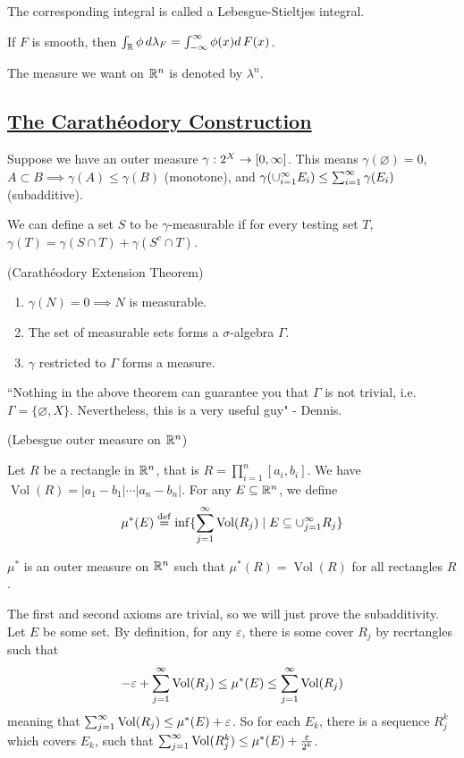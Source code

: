 \documentclass[x11names,reqno,14pt]{extarticle}
\newcommand{\seq}[1]{_{#1 = 1}^\oo}
\DeclareMathOperator{\Vol}{Vol}
\begin{document}
The corresponding integral is called a Lebesgue-Stieltjes integral.

If $F$ is smooth, then $\int_{\mathbb{R}}\phi\,d\lambda_F = \int_{-\infty}^{\infty}\phi(x)d\,F(x)$.

The measure we want on $\mathbb{R}^n$ is denoted by $\lambda^n$. 

\subsection*{\underline{The Carath\'eodory Construction}}

Suppose we have an outer measure $\gamma:2^X\to[0,\infty]$. This means $\gamma(\varnothing) = 0$, $A \subset B \implies \gamma(A) \leq \gamma(B)$ (monotone), and $\gamma(\cup\seq{i}E_i) \leq \sum\seq{i}\gamma(E_i)$ (subadditive).

We can define a set $S$ to be $\gamma$-measurable if for every testing set $T$, $\gamma(T) = \gamma(S \cap T) + \gamma(S^c \cap T)$.

\thm (Carath\'eodory Extension Theorem)

\begin{enumerate}

\item $\gamma(N) = 0 \implies N$ is measurable. 

\item The set of measurable sets forms a $\sigma$-algebra $\Gamma$. 

\item $\gamma$ restricted to $\Gamma$ forms a measure. 

\end{enumerate}

``Nothing in the above theorem can guarantee you that $\Gamma$ is not trivial, i.e. $\Gamma = \{\varnothing, X\}$. Nevertheless, this is a very useful guy" - Dennis. 

 (Lebesgue outer measure on $\mathbb{R}^n$)

Let $R$ be a rectangle in $\mathbb{R}^n$, that is $R = \prod_{i=1}^n[a_i, b_i]$. We have $\Vol(R) = |a_1 - b_1|\cdots|a_n - b_n|$. For any $E \subseteq\mathbb{R}^n$, we define
\[
\mu^*(E) \eqdef \inf\{\sum\seq{j}\Vol(R_j) \mid E \subseteq \cup\seq{j}R_j\}
\] 

\prop

$\mu^*$ is an outer measure on $\mathbb{R}^n$ such that $\mu^*(R) = \Vol(R)$ for all rectangles $R$. 

\proof

The first and second axioms are trivial, so we will just prove the subadditivity. Let $E$ be some set. By definition, for any $\varepsilon$, there is some cover $R_j$ by recrtangles such that 
\[
-\varepsilon + \sum\seq{j}\Vol(R_j) \leq \mu^*(E) \leq \sum\seq{j}\Vol(R_j)
\]
meaning that $\sum\seq{j}\Vol(R_j) \leq \mu^*(E) + \varepsilon$. So for each $E_k$, there is a sequence $R^k_j$ which covers $E_k$, such that $\sum\seq{j}\Vol(R^k_j) \leq \mu^*(E) + \frac{\varepsilon}{2^k}$. 
\end{document}
